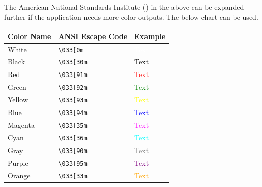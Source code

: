 \begin{fancybox}{1}
The American National Standards Institute ()  in the above can be expanded further if the application needs more color outputs. The below chart can be used.
	\begin{longtable}{|l|l|l|}
	\hline
	\textbf{Color Name} & \textbf{ANSI Escape Code} & \textbf{Example} \\
	\hline
	White & \texttt{\textbackslash 033[0m} & \textcolor{white}{Text} \\
	\hline
	Black & \texttt{\textbackslash 033[30m} & \textcolor{black}{Text} \\
	\hline
	Red & \texttt{\textbackslash 033[91m} & \textcolor{red}{Text} \\
	\hline
	Green & \texttt{\textbackslash 033[92m} & \textcolor{green}{Text} \\
	\hline
	Yellow & \texttt{\textbackslash 033[93m} & \textcolor{yellow}{Text} \\
	\hline
	Blue & \texttt{\textbackslash 033[94m} & \textcolor{blue}{Text} \\
	\hline
	Magenta & \texttt{\textbackslash 033[35m} & \textcolor{magenta}{Text} \\
	\hline
	Cyan & \texttt{\textbackslash 033[36m} & \textcolor{cyan}{Text} \\
	\hline
	Gray & \texttt{\textbackslash 033[90m} & \textcolor{gray}{Text} \\
	\hline
	Purple & \texttt{\textbackslash 033[95m} & \textcolor{purple}{Text} \\
	\hline
	Orange & \texttt{\textbackslash 033[33m} & \textcolor{orange}{Text} \\
	\hline
	\end{longtable}
\end{fancybox}








